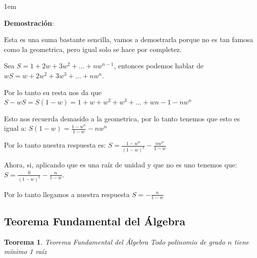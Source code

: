 \documentclass[12pt, fleqn]{report}                             %
\newenvironment{SmallIndentation}[1][0.75em]                    %
        {\begin{adjustwidth}{#1}{}\begin{footnotesize}}             %
        {\end{footnotesize}\end{adjustwidth}}                       %
\newtheorem{Theorem}        {Teorema}[section]                  %
\theoremstyle{break}                                            %
\begin{document}
\begin{itemize}
                        \begin{SmallIndentation}[1em]
                            \textbf{Demostración}:

                            Esta es una suma bastante sencilla, vamos a demostrarla porque no es tan famosa como
                            la geometrica, pero igual solo se hace por completez.

                            Sea $S = 1 + 2w + 3w^2 + \dots + nw^{n-1}$, entonces podemos hablar de 
                            $wS = w + 2w^2 + 3w^3 + \dots + nw^n$.

                            Por lo tanto su resta nos da que 
                            $S-wS = S(1-w) = 1+w+w^2+w^3+\dots+w{n-1}-nw^n$

                            Esto nos recuerda demasido a la geometrica, por lo tanto tenemos que esto es igual a:
                            $S(1-w) = \frac{1-w^n}{1-w} - nw^n$

                            Por lo tanto nuestra respuesta es:
                            $S = \frac{1-w^n}{(1-w)^2} - \frac{nw^n}{1-w}$

                            Ahora, si, aplicando que es una raíz de unidad y que no es uno tenemos que:
                            $S = \frac{0}{(1-w)^2} - \frac{n}{1-w}$.

                            Por lo tanto llegamos a nuestra respuesta $S = - \frac{n}{1-w}$

                        \end{SmallIndentation}
                  
                \end{itemize}



            \clearpage
            \subsection{Teorema Fundamental del Álgebra}

                \begin{Theorem}{Teorema Fundamental del Álgebra}
                    Todo polinomio de grado $n$ tiene mínimo 1 raíz
                \end{Theorem}
\end{document}
